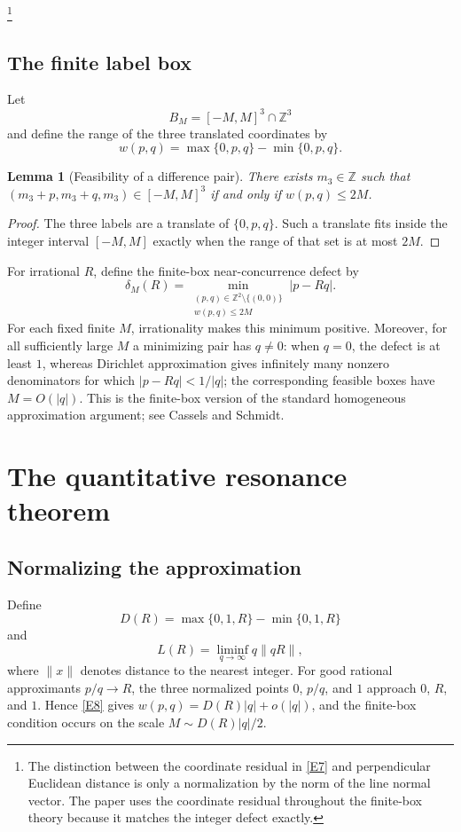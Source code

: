 \documentclass[12pt]{article}
\newtheorem{lemma}[theorem]{Lemma}
\newcommand{\Z}{\mathbb{Z}}
\begin{document}
\footnote{The distinction between the coordinate residual in \eqref{E7} and perpendicular Euclidean distance is only a normalization by the norm of the line normal vector. The paper uses the coordinate residual throughout the finite-box theory because it matches the integer defect exactly.}

\subsection{The finite label box}
Let
\[
B_M=[-M,M]^3\cap\Z^3
\]
and define the range of the three translated coordinates by
\begin{equation}\tag{E8}\label{E8}
w(p,q)=\max\{0,p,q\}-\min\{0,p,q\}.
\end{equation}

\begin{lemma}[Feasibility of a difference pair]
There exists $m_3\in\Z$ such that
$(m_3+p,m_3+q,m_3)\in[-M,M]^3$
if and only if $w(p,q)\le2M$.
\end{lemma}

\begin{proof}
The three labels are a translate of $\{0,p,q\}$. Such a translate fits inside the integer interval $[-M,M]$ exactly when the range of that set is at most $2M$.
\end{proof}

For irrational $R$, define the finite-box near-concurrence defect by
\begin{equation}\tag{E9}\label{E9}
\delta_M(R)=
\min_{\substack{(p,q)\in\Z^2\setminus\{(0,0)\}\\w(p,q)\le2M}}
|p-Rq|.
\end{equation}
For each fixed finite $M$, irrationality makes this minimum positive. Moreover, for all sufficiently large $M$ a minimizing pair has $q\neq0$: when $q=0$, the defect is at least $1$, whereas Dirichlet approximation gives infinitely many nonzero denominators for which $|p-Rq|<1/|q|$; the corresponding feasible boxes have $M=O(|q|)$. This is the finite-box version of the standard homogeneous approximation argument; see Cassels and Schmidt.

\section{The quantitative resonance theorem}

\subsection{Normalizing the approximation}
Define
\begin{equation}\tag{E10}\label{E10}
D(R)=\max\{0,1,R\}-\min\{0,1,R\}
\end{equation}
and
\begin{equation}\tag{E11}\label{E11}
L(R)=\liminf_{q\to\infty}q\lVert qR\rVert,
\end{equation}
where $\lVert x\rVert$ denotes distance to the nearest integer.
For good rational approximants $p/q\to R$, the three normalized points $0$, $p/q$, and $1$ approach $0$, $R$, and $1$. Hence \eqref{E8} gives
$w(p,q)=D(R)|q|+o(|q|)$, and the finite-box condition occurs on the scale $M\sim D(R)|q|/2$.
\end{document}
